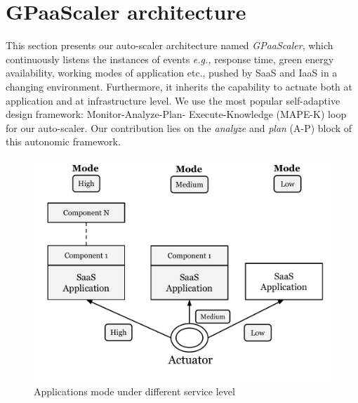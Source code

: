 \section{GPaaScaler architecture}

This section presents our auto-scaler architecture named \emph{GPaaScaler}, which continuously listens the instances of events \emph{e.g.,} response time, green energy availability, working modes of application etc., pushed by SaaS and IaaS in a changing environment. Furthermore, it inherits the capability to actuate both at application and at infrastructure level.
We use the most popular self-adaptive design framework: Monitor-Analyze-Plan-
Execute-Knowledge (MAPE-K) loop \cite{vision} for our auto-scaler.
Our contribution lies on the \emph{analyze} and \emph{plan} (A-P) block of this autonomic framework.

\begin{figure} [ht]
\centering
\includegraphics[scale=.32]{Graphs/action_1.pdf}
\caption{Applications mode under different service level}
\label{fig:modes}
\end{figure}

